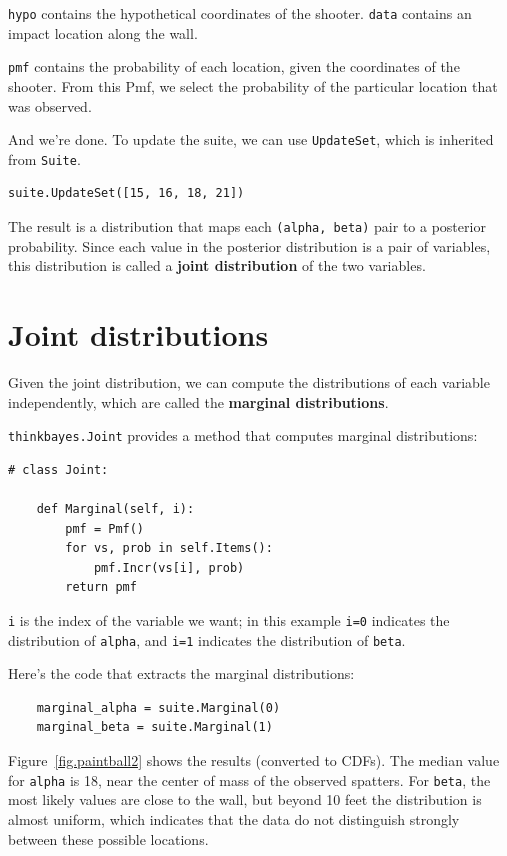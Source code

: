 \documentclass[12pt]{book}
\begin{document}
{\tt hypo} contains the hypothetical coordinates of the shooter.
{\tt data} contains an impact location along the wall.

{\tt pmf} contains the probability of each location, given the
coordinates of the shooter.  From this Pmf, we select the probability
of the particular location that was observed.

And we're done.  To update the suite, we can use {\tt UpdateSet},
which is inherited from {\tt Suite}.

\begin{verbatim}
suite.UpdateSet([15, 16, 18, 21])
\end{verbatim}

The result is a distribution that maps each {\tt (alpha, beta)} pair
to a posterior probability.  Since each value in the posterior
distribution is a pair of variables, this distribution is called a
{\bf joint distribution} of the two variables.


\section{Joint distributions}

Given the joint distribution, we can compute the distributions
of each variable independently, which are called the {\bf marginal
distributions}.

{\tt thinkbayes.Joint} provides a method that computes marginal
distributions:

\begin{verbatim}
# class Joint:

    def Marginal(self, i):
        pmf = Pmf()
        for vs, prob in self.Items():
            pmf.Incr(vs[i], prob)
        return pmf
\end{verbatim}

{\tt i} is the index of the variable we want; in this example
{\tt i=0} indicates the distribution of {\tt alpha}, and
{\tt i=1} indicates the distribution of {\tt beta}.

Here's the code that extracts the marginal distributions:

\begin{verbatim}
    marginal_alpha = suite.Marginal(0)
    marginal_beta = suite.Marginal(1)
\end{verbatim}

Figure~\ref{fig.paintball2} shows the results (converted to CDFs).
The median value for {\tt alpha} is 18, near the center of mass of
the observed spatters.  For {\tt beta}, the most likely values are
close to the wall, but beyond 10 feet the distribution is almost
uniform, which indicates that the data do not distinguish strongly
between these possible locations.
\end{document}
